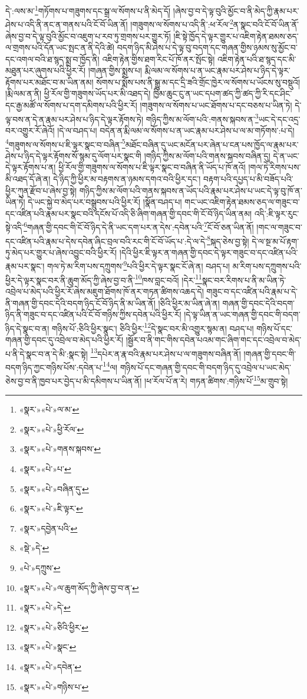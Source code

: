 དེ་:ལས་མ་\footnote{«སྣར་»«པེ་»ལ་མ་}གཏོགས་པ་གཟུགས་དང་སྒྲ་ལ་སོགས་པ་ནི་མེད་དོ། །ཞེས་བྱ་བ་དེ་ལྟ་བུའི་མྱོང་བ་ནི་མེད་ཀྱི་རྣམ་པར་ཤེས་པ་འདི་ནི་ནང་ན་གནས་པའི་ངོ་བོ་ཡིན་ནོ། །གཟུགས་ལ་སོགས་པ་འདི་ནི་:ཕ་རོལ་\footnote{«སྣར་»«པེ་»ཕྱི་རོལ་}ན་སྣང་བའི་ངོ་བོ་ཡིན་ནོ་ཞེས་བྱ་བ་དེ་ལྟ་བུའི་མྱོང་བ་འཇུག་པ་རབ་ཏུ་གྲགས་པར་གྱུར་ཏོ། །ཇི་སྟེ་ཁྱོད་དེ་ལྟར་གྱུར་པ་འཇིག་རྟེན་ཐམས་ཅད་ལ་གྲགས་པའི་དོན་ཡང་སྤང་ན་ནི་དེའི་ཚེ། བདག་ཉིད་མི་ཤེས་པ་དེ་ལྟ་བུ་བདག་དང་གཞན་གྱིས་ཉམས་སུ་མྱོང་བ་དང་འགལ་བའི་ཐ་སྙད་སྨྲ་བ་ཁྱོད་ནི། འཇིག་རྟེན་གྱིས་ཐག་རིང་པོ་ཁོ་ནར་སྤོང་སྟེ། འཇིག་རྟེན་པའི་ཐ་སྙད་དང་མི་མཐུན་པར་ཞུགས་པའི་ཕྱིར་རོ། །གཞན་གྱིས་སྨྲས་པ། རྨི་ལམ་ལ་སོགས་པ་ན་ཡང་རྣམ་པར་ཤེས་པ་ཉིད་དེ་ལྟར་རྟོགས་པར་མཐོང་བ་མ་ཡིན་ནམ། སོགས་པ་སྨོས་པས་ནི་སྒྱུ་མ་དང་དྲི་ཟའི་གྲོང་ཁྱེར་ལ་སོགས་པ་ཡོངས་སུ་བསྡུའོ། །རྨི་ལམ་ན་ནི། ཕྱི་རོལ་གྱི་གཟུགས་ཡོད་པར་མི་འཐད་དེ། ཁྱིམ་ཆུང་ངུ་ན་ཡང་དཔག་ཚད་ཀྱི་ཚད་ཀྱི་རི་དང་ཤིང་དང་རྒྱ་མཚོ་ལ་སོགས་པ་དག་དམིགས་པའི་ཕྱིར་རོ། །གཟུགས་ལ་སོགས་པ་ཡང་ཐོགས་པ་དང་བཅས་པ་ཡིན་ཏེ། དེ་ལྟ་བས་ན་དེ་ན་རྣམ་པར་ཤེས་པ་ཉིད་དེ་ལྟར་རྟོགས་ཏེ། གཉིད་ཀྱིས་མ་ལོག་པའི་:གནས་སྐབས་ན་\footnote{«སྣར་»«པེ་»གནས་སྐབས་}ཡང་དེ་དང་འདྲ་བར་འགྱུར་རོ་ཞེའོ། །དེ་ལ་བཤད་པ། བདེན་ན་རྨི་ལམ་ལ་སོགས་པ་ན་ཡང་རྣམ་པར་ཤེས་པ་ལ་མ་གཏོགས་:པ་དེ། \footnote{«སྣར་»«པེ་»པ་}གཟུགས་ལ་སོགས་པ་ཇི་ལྟར་སྣང་བ་བཞིན་\footnote{«སྣར་»«པེ་»བཞིན་དུ་}མཐོང་བཞིན་དུ་ཡང་མངོན་པར་ཞེན་པ་ངན་པས་ཁྱོད་ལ་རྣམ་པར་ཤེས་པ་ཉིད་དེ་ལྟར་རྟོགས་སོ་སྙམ་དུ་ལོག་པར་སྣང་གི །གཉིད་ཀྱིས་མ་ལོག་པའི་གནས་སྐབས་བཞིན་དུ། དེ་ན་ཡང་དེ་ལྟར་རྟོགས་པ་ན། ཕྱི་རོལ་གྱི་གཟུགས་ལ་སོགས་པ་ཇི་ལྟར་སྣང་བ་བཞིན་ནི་ཡོད་པ་ཁོ་ནའོ། །གལ་ཏེ་རིགས་པས་མི་འཐད་དོ་ཞེ་ན། དེ་ཉིད་ཀྱི་ཕྱིར་མ་བརྟགས་ན་ཉམས་དགའ་བའི་ཕྱིར་དང་། བརྟག་པའི་དཔྱད་པ་མི་བཟོད་པའི་ཕྱིར་ཀུན་རྫོབ་པ་ཞེས་བྱ་སྟེ། གཉིད་ཀྱིས་མ་ལོག་པའི་གནས་སྐབས་ན་ཡོད་པའི་རྣམ་པར་ཤེས་པ་ཡང་དེ་ལྟ་བུ་ཁོ་ན་ཡིན་ཏེ། དེ་ཡང་སྐྱེ་བ་མེད་པར་བསྒྲུབས་པའི་ཕྱིར་རོ། །སྣོན་བཤད་པ། གང་ཡང་འཇིག་རྟེན་ཐམས་ཅད་ལ་གཟུང་བ་དང་འཛིན་པའི་རྣམ་པར་སྣང་བའི་དངོས་པོ་འདི་ཅི་ཞིག་གཞན་གྱི་དབང་གི་ངོ་བོ་ཉིད་ཡིན་ནམ། འདི་:ཇི་ལྟར་རུང་སྟེ་འདི་\footnote{«སྣར་»«པེ་»ཇི་ལྟར་}གཞན་གྱི་དབང་གི་ངོ་བོ་ཉིད་དེ་ནི་ཡང་དག་པར་ན་དེས་:དབེན་པའི་\footnote{«སྣར་»དབྱེན་པའི་}ངོ་བོ་ཅན་ཡིན་ནོ། །གང་ལ་གཟུང་བ་དང་འཛིན་པའི་རྣམ་པ་དེས་དབེན་ཞིང་བྲལ་བའི་རང་གི་ངོ་བོ་ཡོད་པ་:དེ་ལ་དེ་\footnote{«སྡེ་»དེ་}སྐད་ཅེས་བྱ་སྟེ། དེ་ལ་སྔ་མ་པོ་རྟག་ཏུ་མེད་པར་གྱུར་པ་ཞེས་འབྱུང་བའི་ཕྱིར་རོ། །དེའི་ཕྱིར་ཇི་ལྟར་ན་གཞན་གྱི་དབང་དེ་ལྟར་གཟུང་བ་དང་འཛིན་པའི་རྣམ་པར་སྣང་། གལ་ཏེ་མ་རིག་པས་དཀྲུགས་\footnote{«པེ་»དཀྲུས་}པའི་ཕྱིར་དེ་ལྟར་སྣང་ངོ་ཞེ་ན། བཤད་པ། མ་རིག་པས་དཀྲུགས་པའི་ཕྱིར་དེ་ལྟར་སྣང་བར་ནི་ཆུག་མོད་ཀྱི་ཞེས་བྱ་བ་ནི་\footnote{«སྣར་»«པེ་»ལ་ཆུག་མོད་ཀྱི་ཞེས་བྱ་བ་ན་}ཁས་བླང་བའོ། །དེར་\footnote{«སྣར་»«པེ་»དེ་}སྣང་བར་རིགས་པ་ནི་མ་ཡིན་ཏེ་འབྲེལ་པ་མེད་པའི་ཕྱིར་རོ་ཞེས་མཇུག་ཐོགས་ཁོ་ནར་གཏན་ཚིགས་འཆད་དེ། གཟུང་བ་དང་འཛིན་པའི་རྣམ་པ་དེ་ནི་གཞན་གྱི་དབང་དེའི་བདག་ཉིད་ངོ་བོ་ཉིད་ནི་མ་ཡིན་ནོ། །ཅིའི་ཕྱིར་མ་ཡིན་ཞེ་ན། གཞན་གྱི་དབང་དེའི་བདག་ཉིད་ནི་གཟུང་བ་དང་འཛིན་པའི་ངོ་བོ་གཉིས་ཀྱིས་དབེན་པའི་ཕྱིར་རོ། །དེ་ལྟ་ཡིན་ན་ཡང་གཞན་གྱི་དབང་གི་བདག་ཉིད་དེ་སྣང་བ་ན། གཉིས་པོ་:ཅིའི་ཕྱིར་སྣང་། ཅིའི་ཕྱིར་\footnote{«སྣར་»«པེ་»ཅིའི་ཕྱིར་}དེ་སྣང་བར་མི་འགྱུར་སྙམ་ན། བཤད་པ། གཉིས་པོ་དང་གཞན་གྱི་དབང་དུ་འབྲེལ་བ་མེད་པའི་ཕྱིར་རོ། །སྦྱོར་བ་ནི་གང་གིས་དབེན་པའམ་གང་ཞིག་གང་དང་འབྲེལ་བ་མེད་པ་ནི་དེ་སྣང་བ་ན་དེ་མི་:སྣང་སྟེ། \footnote{«སྣར་»«པེ་»སྣང་}དཔེར་ན་རྣ་བའི་རྣམ་པར་ཤེས་པ་ལ་གཟུགས་བཞིན་ནོ། །གཞན་གྱི་དབང་གི་བདག་ཉིད་ཀྱང་གཉིས་པོས་:དབེན་པ་\footnote{«སྣར་»«པེ་»དབེན་}ལ། གཉིས་པོ་དང་གཞན་གྱི་དབང་གི་བདག་ཉིད་དུ་འབྲེལ་པ་ཡང་མེད་ཅེས་བྱ་བ་ནི་ཁྱབ་པར་བྱེད་པ་མི་དམིགས་པ་ཡིན་ནོ། །ཕ་རོལ་པོ་ན་རེ། གཏན་ཚིགས་:གཉིས་པོ་\footnote{«སྣར་»«པེ་»གཉིས་པ་}མ་གྲུབ་སྟེ། 